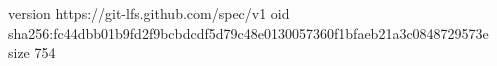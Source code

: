 version https://git-lfs.github.com/spec/v1
oid sha256:fc44dbb01b9fd2f9bcbdcdf5d79c48e0130057360f1bfaeb21a3c0848729573e
size 754
